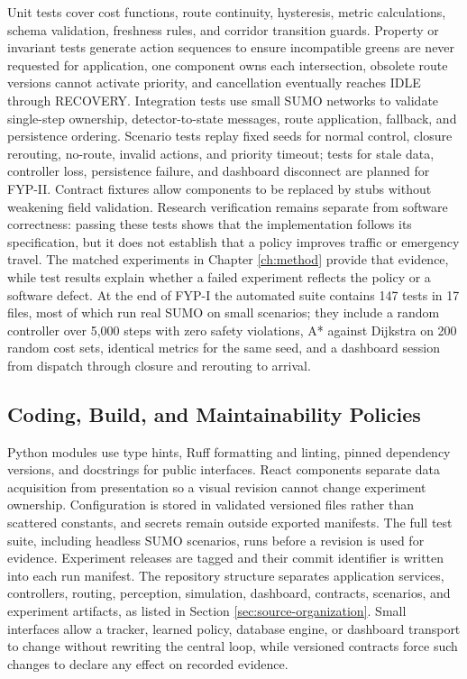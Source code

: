 Unit tests cover cost functions, route continuity, hysteresis, metric calculations, schema validation, freshness rules, and corridor transition guards. Property or invariant tests generate action sequences to ensure incompatible greens are never requested for application, one component owns each intersection, obsolete route versions cannot activate priority, and cancellation eventually reaches IDLE through RECOVERY. Integration tests use small SUMO networks to validate single-step ownership, detector-to-state messages, route application, fallback, and persistence ordering. Scenario tests replay fixed seeds for normal control, closure rerouting, no-route, invalid actions, and priority timeout; tests for stale data, controller loss, persistence failure, and dashboard disconnect are planned for FYP-II. Contract fixtures allow components to be replaced by stubs without weakening field validation. Research verification remains separate from software correctness: passing these tests shows that the implementation follows its specification, but it does not establish that a policy improves traffic or emergency travel. The matched experiments in Chapter \ref{ch:method} provide that evidence, while test results explain whether a failed experiment reflects the policy or a software defect. At the end of FYP-I the automated suite contains 147 tests in 17 files, most of which run real SUMO on small scenarios; they include a random controller over 5,000 steps with zero safety violations, A* against Dijkstra on 200 random cost sets, identical metrics for the same seed, and a dashboard session from dispatch through closure and rerouting to arrival.

\subsection{Coding, Build, and Maintainability Policies}

Python modules use type hints, Ruff formatting and linting, pinned dependency versions, and docstrings for public interfaces. React components separate data acquisition from presentation so a visual revision cannot change experiment ownership. Configuration is stored in validated versioned files rather than scattered constants, and secrets remain outside exported manifests. The full test suite, including headless SUMO scenarios, runs before a revision is used for evidence. Experiment releases are tagged and their commit identifier is written into each run manifest. The repository structure separates application services, controllers, routing, perception, simulation, dashboard, contracts, scenarios, and experiment artifacts, as listed in Section \ref{sec:source-organization}. Small interfaces allow a tracker, learned policy, database engine, or dashboard transport to change without rewriting the central loop, while versioned contracts force such changes to declare any effect on recorded evidence.

